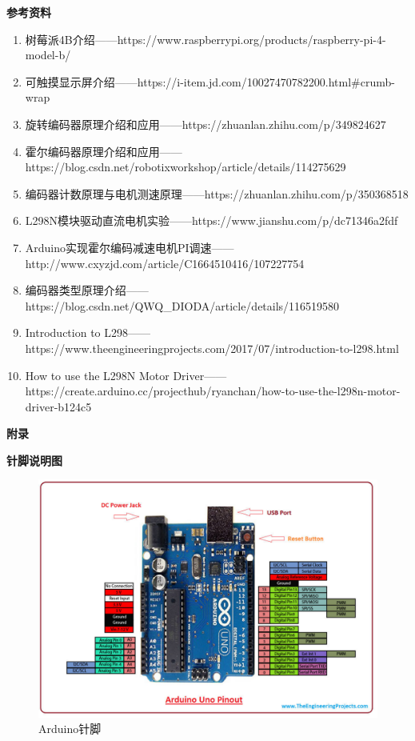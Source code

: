 \documentclass[UTF8,14pt]{article}
\newcommand\sectionone[1]{\centerline{\Large{\bfseries{#1}}}}
\newcommand\sectiontwo[1]{\centerline{\large{\bfseries{#1}}}}
\begin{document}
\sectionone{参考资料}
\begin{enumerate}
	\item 树莓派4B介绍——https://www.raspberrypi.org/products/raspberry-pi-4-model-b/
	\item 可触摸显示屏介绍——https://i-item.jd.com/10027470782200.html\#crumb-wrap
	\item 旋转编码器原理介绍和应用——https://zhuanlan.zhihu.com/p/349824627
	\item 霍尔编码器原理介绍和应用——https://blog.csdn.net/robotixworkshop/article/details/114275629
	\item 编码器计数原理与电机测速原理——https://zhuanlan.zhihu.com/p/350368518
	\item L298N模块驱动直流电机实验——https://www.jianshu.com/p/dc71346a2fdf
	\item Arduino实现霍尔编码减速电机PI调速——http://www.cxyzjd.com/article/C1664510416/107227754
	\item 编码器类型原理介绍——https://blog.csdn.net/QWQ\_DIODA/article/details/116519580
	\item Introduction to L298——https://www.theengineeringprojects.com/2017/07/introduction-to-l298.html
	\item How to use the L298N Motor Driver——https://create.arduino.cc/projecthub/ryanchan/how-to-use-the-l298n-motor-driver-b124c5
\end{enumerate}


\clearpage
\sectionone{附录}
\sectiontwo{针脚说明图}
\begin{figure}[!h]
	\centering
	\vspace{-10pt}
	\includegraphics[width=14cm]{figures/arduino-uno.pdf}
	\caption{Arduino针脚}
	\vspace{-15pt}
\end{figure}
\end{document}

